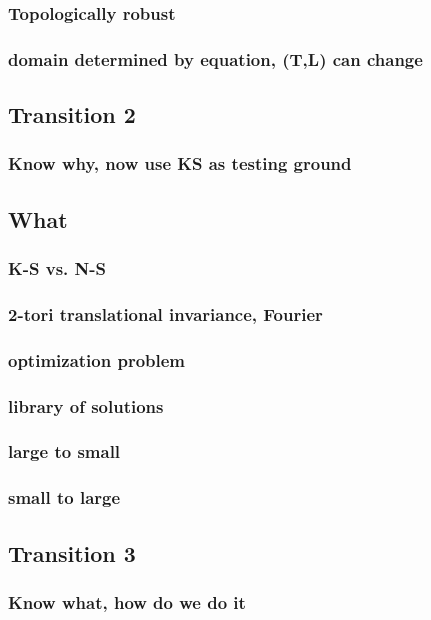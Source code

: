 \documentclass{article}
\begin{document}
            \subsubsection{Topologically robust}
			\subsubsection{domain determined by equation, (T,L) can change}
		\subsection{Transition 2}
			\subsubsection{Know why, now use KS as testing ground }
		\subsection{What}
			\subsubsection{K-S vs. N-S}
			\subsubsection{2-tori translational invariance, Fourier}
			\subsubsection{optimization problem}
			\subsubsection{library of solutions}
			\subsubsection{large to small}
			\subsubsection{small to large}
		\subsection{Transition 3}
            \subsubsection{Know what, how do we do it}
\end{document}
